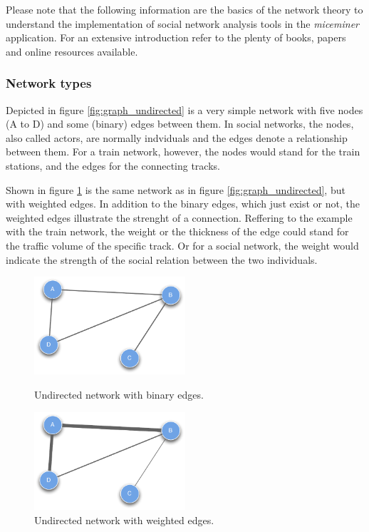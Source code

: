 Please note that the following information are the basics of the network theory to understand the implementation of social network analysis tools in the \textit{miceminer} application. For an extensive introduction refer to the plenty of books, papers and online resources available.   

\subsubsection{Network types}
\label{subsubsec:net_types}
Depicted in figure \ref{fig:graph_undirected} is a very simple network with five nodes (A to D) and some (binary) edges between them. In social networks, the nodes, also called actors, are normally indviduals and the edges denote a relationship between them. For a train network, however, the nodes would stand for the train stations, and the edges for the connecting tracks.

Shown in figure \ref{fig:graph_undirected_weighted} is the same network as in figure \ref{fig:graph_undirected}, but with weighted edges. In addition to the binary edges, which just exist or not, the weighted edges illustrate the strenght of a connection. Reffering to the example with the train network, the weight or the thickness of the edge could stand for the traffic volume of the specific track. Or for a social network, the weight would indicate the strength of the social relation between the two individuals.  

\begin{figure}[htbp]
	\begin{minipage}[b]{0.5\textwidth}
    \captionsetup{width=.5\textwidth}
		\centering
			\includegraphics[width=0.5\textwidth]{assets/pdf/graph_undirected.pdf}
			\caption{Undirected network with binary edges.}
			\label{fig:graph_undirected}
	\end{minipage}
	\hspace{0.5cm}
	\begin{minipage}[b]{0.5\textwidth}
    \captionsetup{width=.5\textwidth}
		\centering
			\includegraphics[width=0.5\textwidth]{assets/pdf/graph_undirected_weighted.pdf}
			\caption{Undirected network with weighted edges.}
			\label{fig:graph_undirected_weighted}
	\end{minipage}
\end{figure}

